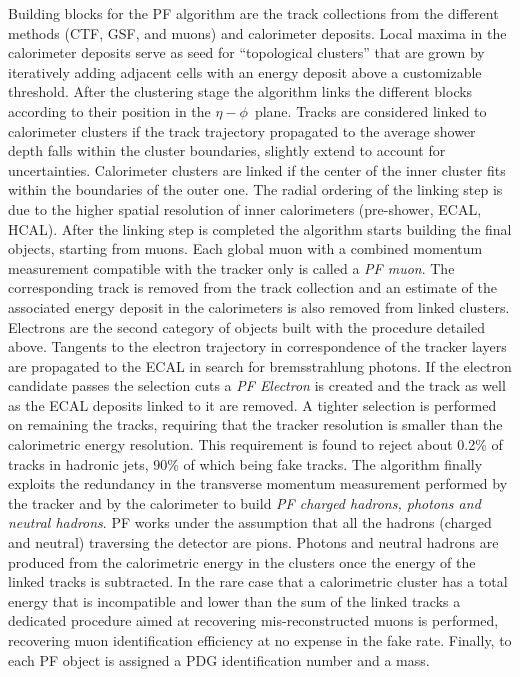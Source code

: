 Building blocks for the PF algorithm are the track collections from the different methods (CTF, GSF, and muons) and calorimeter deposits. Local maxima in the calorimeter deposits serve as seed for ``topological clusters'' that are grown by iteratively adding adjacent cells with an energy deposit above a customizable threshold. After the clustering stage the algorithm links the different blocks according to their position in the $\eta-\phi$\ plane. Tracks are considered linked to calorimeter clusters if the track trajectory propagated to the average shower depth falls within the cluster boundaries, slightly extend to account for uncertainties. Calorimeter clusters are linked if the center of the inner cluster fits within the boundaries of the outer one. The radial ordering of the linking step is due to the higher spatial resolution of inner calorimeters (pre-shower, ECAL, HCAL). After the linking step is completed the algorithm starts building the final objects, starting from muons. Each global muon with a combined momentum measurement compatible with the tracker only is called a \emph{PF muon}. The corresponding track is removed from the track collection and an estimate of the associated energy deposit in the calorimeters is also removed from linked clusters. Electrons are the second category of objects built with the procedure detailed above. Tangents to the electron trajectory in correspondence of the tracker layers are propagated to the ECAL in search for bremsstrahlung photons. If the electron candidate passes the selection cuts a \emph{PF Electron} is created and the track as well as the ECAL deposits linked to it are removed. A tighter selection is performed on remaining the tracks, requiring that the tracker \pT resolution is smaller than the calorimetric energy resolution. This requirement is found to reject about 0.2\% of tracks in hadronic jets, 90\% of which being fake tracks. 
The algorithm finally exploits the redundancy in the transverse momentum measurement performed by the tracker and by the calorimeter to build \emph{PF charged hadrons, photons and neutral hadrons}. PF works under the assumption that all the hadrons (charged and neutral) traversing the detector are pions. Photons and neutral hadrons are produced from the calorimetric energy in the clusters once the energy of the linked tracks is subtracted. In the rare case that a calorimetric cluster has a total energy that is incompatible and lower than the sum of the linked tracks a dedicated procedure aimed at recovering mis-reconstructed muons is performed, recovering muon identification efficiency at no expense in the fake rate. Finally, to each PF object is assigned a PDG identification number and a mass.

